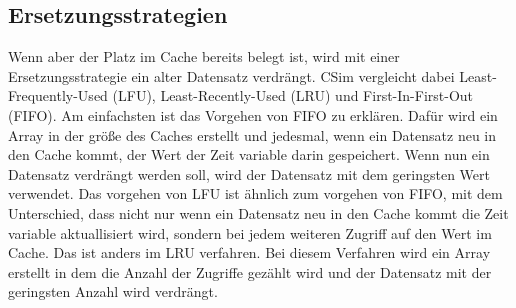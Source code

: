 \documentclass{scrreprt}
\begin{document}
\subsection{Ersetzungsstrategien}\label{subsec:Ersetzungsstrategien}
Wenn aber der Platz im Cache bereits belegt ist, wird mit einer Ersetzungsstrategie ein alter Datensatz verdrängt. CSim vergleicht dabei Least-Frequently-Used (LFU), Least-Recently-Used (LRU) und First-In-First-Out (FIFO). \newline
Am einfachsten ist das Vorgehen von FIFO zu erklären. Dafür wird ein Array in der größe des Caches erstellt und jedesmal, wenn ein Datensatz neu in den Cache kommt, der Wert der Zeit variable darin gespeichert. Wenn nun ein Datensatz verdrängt werden soll, wird der Datensatz mit dem geringsten Wert verwendet. \newline
Das vorgehen von LFU ist ähnlich zum vorgehen von FIFO, mit dem Unterschied, dass nicht nur wenn ein Datensatz neu in den Cache kommt die Zeit variable aktuallisiert wird, sondern bei jedem weiteren Zugriff auf den Wert im Cache. \newline
Das ist anders im LRU verfahren. Bei diesem Verfahren wird ein Array erstellt in dem die Anzahl der Zugriffe gezählt wird und der Datensatz mit der geringsten Anzahl wird verdrängt.
\end{document}
